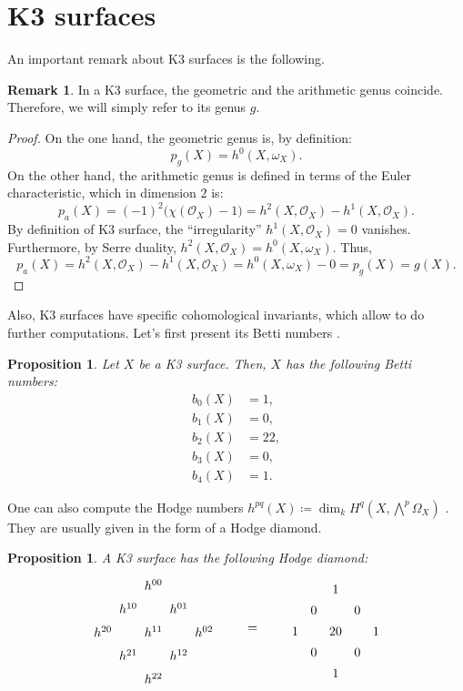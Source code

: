 \documentclass{report}
\newtheorem{proposition}[equation]{Proposition}
\theoremstyle{definition}
\newtheorem{remark}[equation]{Remark}
\begin{document}
\section{K3 surfaces}

An important remark about K3 surfaces is the following.

\begin{remark}
In a K3 surface, the geometric and the arithmetic genus coincide. Therefore, we will simply refer to its genus $g$.
\end{remark}

\begin{proof}
On the one hand, the geometric genus is, by definition:
\[p_g(X)=h^0(X,\omega_X).\]
On the other hand, the arithmetic genus is defined in terms of the Euler characteristic, which in dimension $2$ is:
\[p_a(X)=(-1)^2\big(\chi(\mathcal{O}_X)-1\big)=h^2(X,\mathcal{O}_X)-h^1(X,\mathcal{O}_X).\]
By definition of K3 surface, the ``irregularity'' $h^1(X,\mathcal{O}_X)=0$ vanishes. Furthermore, by Serre duality, $h^2(X,\mathcal{O}_X)=h^0(X,\omega_X)$. Thus,
\[p_a(X)=h^2(X,\mathcal{O}_X)-h^1(X,\mathcal{O}_X)=h^0(X,\omega_X)-0=p_g(X)=g(X).\]
\end{proof}

Also, K3 surfaces have specific cohomological invariants, which allow to do further computations. Let's first present its Betti numbers \cite[Proposition~2.3]{liedtke2016lectures}.

\begin{proposition}
\label{pro:k3-betti}
Let $X$ be a K3 surface. Then, $X$ has the following Betti numbers:
\begin{align*}
b_0(X)&=1,\\
b_1(X)&=0,\\
b_2(X)&=22,\\
b_3(X)&=0,\\
b_4(X)&=1.
\end{align*}
\end{proposition}

One can also compute the Hodge numbers $h^{pq}(X)\coloneqq\dim_kH^q(X,\bigwedge^p\Omega_X)$ \cite[Proposition~2.4]{liedtke2016lectures}. They are usually given in the form of a Hodge diamond.

\begin{proposition}
A K3 surface has the following Hodge diamond:
\[\begin{tikzcd}[column sep=-3pt,row sep=3pt]&&h^{00}\\&h^{10}&&h^{01}\\h^{20}&&h^{11}&&h^{02}\\&h^{21}&&h^{12}\\&&h^{22}\end{tikzcd}\qquad=\qquad\begin{tikzcd}[column sep=1pt,row sep=3pt]&&1\\&0&&0\\1&&20&&1\\&0&&0\\&&1\end{tikzcd}\]
\end{proposition}
\end{document}
